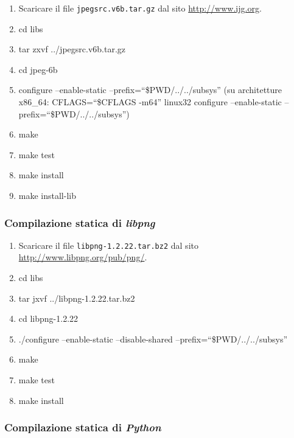 \begin{enumerate}
\item Scaricare il file \texttt{jpegsrc.v6b.tar.gz} dal sito \href{http://www.ijg.org}{http://www.ijg.org}.
\item cd libs
\item tar zxvf ../jpegsrc.v6b.tar.gz
\item cd jpeg-6b
\item configure --enable-static --prefix=``\$PWD/../../subsys''
\newline
{\small
(su architetture x86\_64: CFLAGS=``\$CFLAGS -m64'' linux32 configure --enable-static --prefix=``\$PWD/../../subsys'')
}
\item make
\item make test
\item make install
\item make install-lib
\end{enumerate}

\subsubsection{Compilazione statica di \emph{libpng}} \label{sssec:blender-png}

\begin{enumerate}
\item Scaricare il file \texttt{libpng-1.2.22.tar.bz2} dal sito \href{http://www.libpng.org/pub/png/libpng.html}{http://www.libpng.org/pub/png/}.
\item cd libs
\item tar jxvf ../libpng-1.2.22.tar.bz2
\item cd libpng-1.2.22
\item ./configure --enable-static --disable-shared --prefix=``\$PWD/../../subsys''
\item make
\item make test
\item make install
\end{enumerate}

\subsubsection{Compilazione statica di \emph{Python}} \label{sssec:blender-python}


